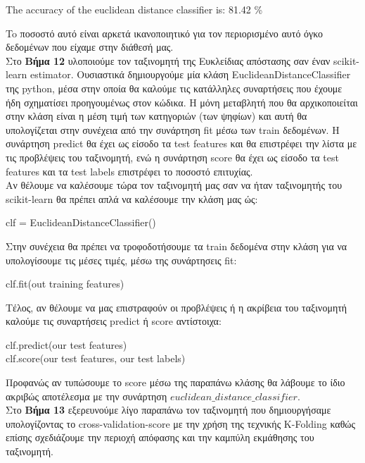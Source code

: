 \documentclass[11pt]{article} %
\begin{document}
\begin{center}
The accuracy of the euclidean distance classifier is: 81.42 \%
\end{center}

To ποσοστό αυτό είναι αρκετά ικανοποιητικό για τον περιορισμένο αυτό όγκο δεδομένων που είχαμε στην διάθεσή μας.\\


Στο \textbf{Βήμα 12} υλοποιούμε τον ταξινομητή της Ευκλείδιας απόστασης σαν έναν scikit-learn estimator. Ουσιαστικά δημιουργούμε μία κλάση EuclideanDistanceClassifier της python, μέσα στην οποία θα καλούμε τις κατάλληλες συναρτήσεις που έχουμε ήδη σχηματίσει προηγουμένως στον κώδικα. Η μόνη μεταβλητή που θα αρχικοποιείται στην κλάση είναι η μέση τιμή των κατηγοριών (των ψηφίων) και αυτή θα υπολογίζεται στην συνέχεια από την συνάρτηση fit μέσω των train δεδομένων. Η συνάρτηση predict θα έχει ως είσοδο τα test features και θα επιστρέφει την λίστα με τις προβλέψεις του ταξινομητή, ενώ η συνάρτηση score θα έχει ως είσοδο τα test features και τα test labels επιστρέφει το ποσοστό επιτυχίας.\\

Αν θέλουμε να καλέσουμε τώρα τον ταξινομητή μας σαν να ήταν ταξινομητής του scikit-learn θα πρέπει απλά να καλέσουμε την κλάση μας ώς:
\begin{center}
clf  = EuclideanDistanceClassifier()
\end{center}

Στην συνέχεια θα πρέπει να τροφοδοτήσουμε τα train δεδομένα στην κλάση για να υπολογίσουμε τις μέσες τιμές, μέσω της συνάρτησεις fit:
\begin{center}
clf.fit(out training features)
\end{center}

Τέλος, αν θέλουμε να μας επιστραφούν οι προβλέψεις ή η ακρίβεια του ταξινομητή καλούμε τις συναρτήσεις predict ή score αντίστοιχα:
\begin{center}
clf.predict(our test features)\\
clf.score(our test features, our test labels)
\end{center}

Προφανώς αν τυπώσουμε το score μέσω της παραπάνω κλάσης θα λάβουμε το ίδιο ακριβώς αποτέλεσμα με την συνάρτηση $euclidean\_distance\_classifier$.\\

Στο \textbf{Βήμα 13} εξερευνούμε λίγο παραπάνω τον ταξινομητή που δημιουργήσαμε υπολογίζοντας το cross-validation-score με την χρήση της τεχνικής K-Folding καθώς επίσης σχεδιάζουμε την περιοχή απόφασης και την καμπύλη εκμάθησης του ταξινομητή.\\
\end{document}
